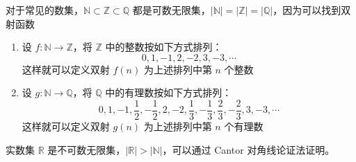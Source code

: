 \begin{example}
    对于常见的数集，$\mathbb{N} \subset \mathbb{Z} \subset \mathbb{Q} $ 都是可数无限集，$ |\mathbb{N}| = |\mathbb{Z}| = |\mathbb{Q}| $，因为可以找到双射函数
    \begin{enumerate}
        \item 设 $ f:\mathbb{N}\to \mathbb{Z} $，将 $ \mathbb{Z} $ 中的整数按如下方式排列：
        \[
            0, 1, -1, 2, -2, 3, -3, \cdots  
        \]
        这样就可以定义双射 $ f(n) $ 为上述排列中第 $ n $ 个整数
        \item 设 $ g:\mathbb{N}\to \mathbb{Q} $，将 $ \mathbb{Q} $ 中的有理数按如下方式排列：
        \[
            0, 1, -1, \frac{1}{2}, -\frac{1}{2}, 2, -2, \frac{1}{3}, -\frac{1}{3}, \frac{2}{3}, -\frac{2}{3}, 3, -3, \cdots
        \]
        这样就可以定义双射 $ g(n) $ 为上述排列中第 $ n $ 个有理数
    \end{enumerate}
    实数集 $ \mathbb{R} $ 是不可数无限集，$ |\mathbb{R}| > |\mathbb{N}| $，可以通过 Cantor 对角线论证法证明。
\end{example}
\vspace{0.5em}


\newpage